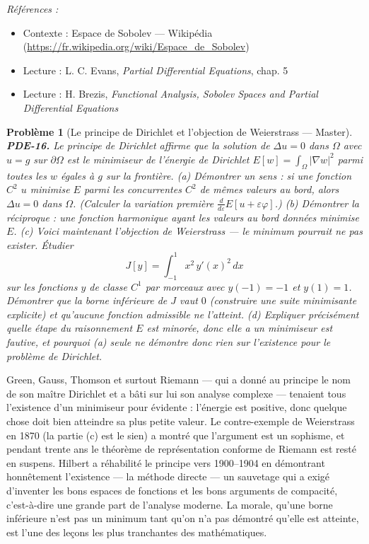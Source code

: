 \documentclass[11pt]{article}
\newtheorem{problem}{Problème}
\newenvironment{refs}{\par\small\noindent\emph{Références :}\begin{itemize}\setlength\itemsep{0pt}}{\end{itemize}\normalsize}
\begin{document}
\begin{refs}
\item Contexte : Espace de Sobolev --- Wikipédia (\url{https://fr.wikipedia.org/wiki/Espace_de_Sobolev})
\item Lecture : L. C. Evans, \textit{Partial Differential Equations}, chap. 5
\item Lecture : H. Brezis, \textit{Functional Analysis, Sobolev Spaces and Partial Differential Equations}
\end{refs}

\bigskip

\begin{problem}[{Le principe de Dirichlet et l'objection de Weierstrass --- Master}]
\textbf{PDE-16.} Le principe de Dirichlet affirme que la
solution de $\Delta u = 0$ dans $\Omega$ avec $u = g$ sur $\partial\Omega$ est
le minimiseur de l'énergie de Dirichlet $E[w] = \int_\Omega |\nabla w|^2$ parmi toutes les
$w$ égales à $g$ sur la frontière. (a) Démontrer un sens : si une fonction $C^2$
$u$ minimise $E$ parmi les concurrentes $C^2$ de mêmes valeurs au bord,
alors $\Delta u = 0$ dans $\Omega$. (Calculer la variation première
$\frac{d}{d\varepsilon} E[u + \varepsilon\varphi]$.) (b) Démontrer la réciproque : une
fonction harmonique ayant les valeurs au bord données minimise $E$. (c) Voici maintenant
l'objection de Weierstrass --- le minimum pourrait ne pas exister. Étudier
\[ J[y] = \int_{-1}^{1} x^2\,y'(x)^2\,dx \]
sur les fonctions $y$ de classe $C^1$ par morceaux avec $y(-1) = -1$ et $y(1) = 1$.
Démontrer que la borne inférieure de $J$ vaut $0$ (construire une suite minimisante
explicite) et qu'aucune fonction admissible ne l'atteint. (d) Expliquer précisément quelle étape
du raisonnement \og{} $E$ est minorée, donc elle a un minimiseur \fg{} est fautive, et pourquoi (a)
seule ne démontre donc rien sur l'existence pour le problème de Dirichlet.
\end{problem}

\noindent Green, Gauss, Thomson et surtout Riemann --- qui a donné au principe le nom de
son maître Dirichlet et a bâti sur lui son analyse complexe --- tenaient tous l'existence d'un
minimiseur pour évidente : l'énergie est positive, donc quelque chose doit bien atteindre sa plus
petite valeur. Le contre-exemple de Weierstrass en 1870 (la partie (c) est le sien) a montré que
l'argument est un sophisme, et pendant trente ans le théorème de représentation conforme de
Riemann est resté en suspens. Hilbert a réhabilité le principe vers 1900--1904 en démontrant
honnêtement l'existence --- la \og{} méthode directe \fg{} --- un sauvetage qui a exigé d'inventer les bons
espaces de fonctions et les bons arguments de compacité, c'est-à-dire une grande part de l'analyse
moderne. La morale, qu'une borne inférieure n'est pas un minimum tant qu'on n'a pas démontré
qu'elle est atteinte, est l'une des leçons les plus tranchantes des mathématiques.
\end{document}
